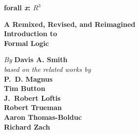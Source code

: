 

\pagestyle{empty}

\vspace*{80pt}

\begin{raggedleft}
\fontsize{30pt}{24pt}\sffamily
\selectfont
  \textbf{forall 
  {\fontsize{37pt}{24pt}\selectfont\rmfamily\textit{x}}: 
  $R^3$}

\medskip\fontsize{18pt}{20pt}\selectfont

\textbf{A Remixed, Revised, and Reimagined\\Introduction to\\ Formal Logic}

\vfill
\fontsize{12pt}{16pt}\selectfont \textit{By }  \textbf{Davis A. Smith}\\
     \textit{based on the related works by}\\
      \textbf{P.~D. Magnus}\\
      \textbf{Tim Button}\\
      \textbf{J.~Robert Loftis}\\
      \textbf{Robert Trueman}\\
      \textbf{Aaron Thomas-Bolduc}\\
      \textbf{Richard Zach}\par


\vfill
\textbf{\forallxversion}\par
\end{raggedleft}


\newpage


